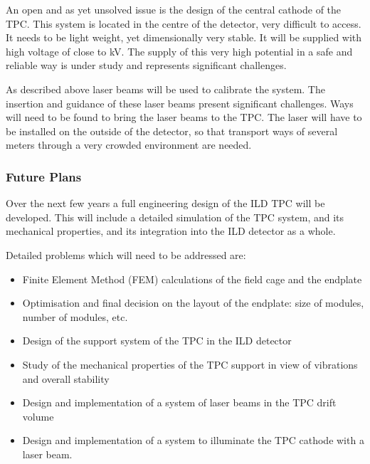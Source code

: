 An open and as yet unsolved issue is the design of the central cathode of the TPC. This system is located in the centre of the detector, very difficult to access. It needs to be light weight, yet dimensionally very stable. It will be supplied with high voltage of close to \unit[100]{kV}. The supply of this very high potential in a safe and reliable way is under study and represents significant challenges.

As described above laser beams will be used to calibrate the system. The insertion and guidance of these laser beams present significant challenges. Ways will need to be found to bring the laser beams to the TPC. The laser will have to be installed on the outside of the detector, so that transport ways of several meters through a very crowded environment are needed.

\subsubsection{Future Plans}
Over the next few years a full engineering design of the ILD TPC will be developed. This will include a detailed simulation of the TPC system, and its mechanical properties, and its integration into the ILD detector as a whole.

Detailed problems which will need to be addressed are:

\begin{itemize}
\item Finite Element Method (FEM) calculations of the field cage and the endplate
\item Optimisation and final decision on the layout of the endplate: size of modules, number of modules, etc.
\item Design of the support system of the TPC in the ILD detector
\item Study of the mechanical properties of the TPC support in view of vibrations and overall stability
\item Design and implementation of a system of laser beams in the TPC drift volume
\item Design and implementation of a system to illuminate the TPC cathode with a laser beam.
\end{itemize}



